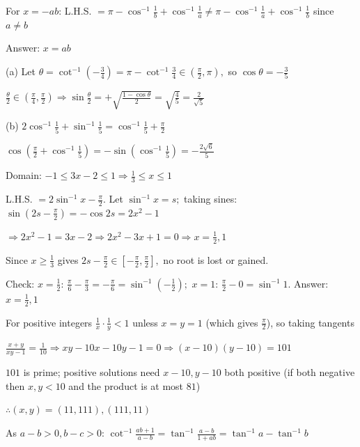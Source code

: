   For $x = -ab$: L.H.S. $= \pi - \cos^{-1}\frac{1}{b} + \cos^{-1}\frac{1}{a}\neq \pi - \cos^{-1}\frac{1}{a} + \cos^{-1}\frac{1}{b}$
  since $a\neq b$

  Answer: $x = ab$

\item (a) Let $\theta = \cot^{-1}\left(-\frac{3}{4}\right) = \pi - \cot^{-1}\frac{3}{4}\in\left(\frac{\pi}{2}, \pi\right),$ so
  $\cos\theta = -\frac{3}{5}$

  $\frac{\theta}{2}\in\left(\frac{\pi}{4}, \frac{\pi}{2}\right) \Rightarrow \sin\frac{\theta}{2} = +\sqrt{\frac{1 - \cos\theta}{2}}
  = \sqrt{\frac{4}{5}} = \frac{2}{\sqrt{5}}$

  (b) $2\cos^{-1}\frac{1}{5} + \sin^{-1}\frac{1}{5} = \cos^{-1}\frac{1}{5} + \frac{\pi}{2}$

  $\cos\left(\frac{\pi}{2} + \cos^{-1}\frac{1}{5}\right) = -\sin\left(\cos^{-1}\frac{1}{5}\right) = -\frac{2\sqrt{6}}{5}$

\item Domain: $-1\leq 3x - 2\leq 1 \Rightarrow \frac{1}{3}\leq x\leq 1$

  L.H.S. $= 2\sin^{-1}x - \frac{\pi}{2}.$ Let $\sin^{-1}x = s;$ taking sines: $\sin\left(2s - \frac{\pi}{2}\right) = -\cos2s =
  2x^2 - 1$

  $\Rightarrow 2x^2 - 1 = 3x - 2 \Rightarrow 2x^2 - 3x + 1 = 0 \Rightarrow x = \frac{1}{2}, 1$

  Since $x\geq \frac{1}{3}$ gives $2s - \frac{\pi}{2}\in\left[-\frac{\pi}{2}, \frac{\pi}{2}\right],$ no root is lost or gained.

  Check: $x = \frac{1}{2}$: $\frac{\pi}{6} - \frac{\pi}{3} = -\frac{\pi}{6} = \sin^{-1}\left(-\frac{1}{2}\right);$ $x = 1$:
  $\frac{\pi}{2} - 0 = \sin^{-1}1.$ Answer: $x = \frac{1}{2}, 1$

\item For positive integers $\frac{1}{x}\cdot\frac{1}{y} < 1$ unless $x = y = 1$ (which gives $\frac{\pi}{2}$), so taking tangents

  $\frac{x + y}{xy - 1} = \frac{1}{10} \Rightarrow xy - 10x - 10y - 1 = 0 \Rightarrow (x - 10)(y - 10) = 101$

  $101$ is prime; positive solutions need $x - 10, y - 10$ both positive (if both negative then $x, y < 10$ and the product is
  at most $81$)

  $\therefore (x, y) = (11, 111), (111, 11)$

\item As $a - b > 0, b - c > 0$: $\cot^{-1}\frac{ab + 1}{a - b} = \tan^{-1}\frac{a - b}{1 + ab} = \tan^{-1}a - \tan^{-1}b$

